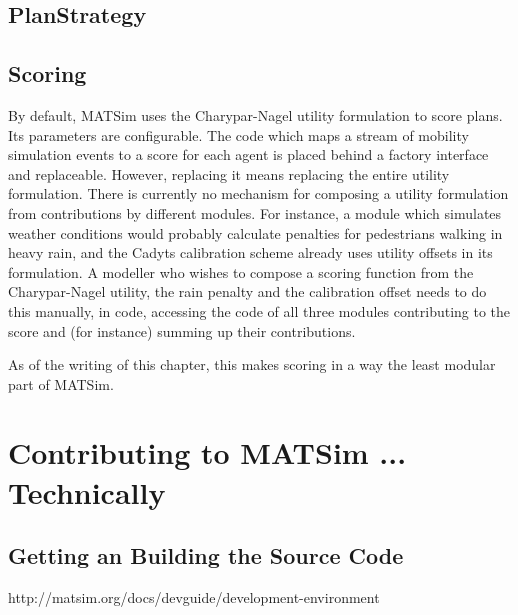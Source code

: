 \subsection{PlanStrategy}

\subsection{Scoring}
By default, MATSim uses the Charypar-Nagel utility formulation to score plans. Its parameters
are configurable.
The code which maps a stream of mobility simulation events to a score for each agent is placed behind a factory
 interface and replaceable. However, replacing it means replacing the entire utility formulation. There is
 currently no mechanism for composing a utility formulation from contributions by different modules.
 For instance, a module which simulates weather conditions would probably calculate penalties for pedestrians
  walking in heavy rain, and the Cadyts calibration scheme already uses utility offsets in its formulation. A modeller
  who wishes to compose a scoring function from the Charypar-Nagel utility, the rain penalty and the calibration offset
  needs to do this manually, in code, accessing the code of all three modules contributing to the score and (for instance) summing
  up their contributions.

As of the writing of this chapter, this makes scoring in a way the least modular part of MATSim.


\section{Contributing to MATSim ... Technically}
\subsection{Getting an Building the Source Code}
http://matsim.org/docs/devguide/development-environment

